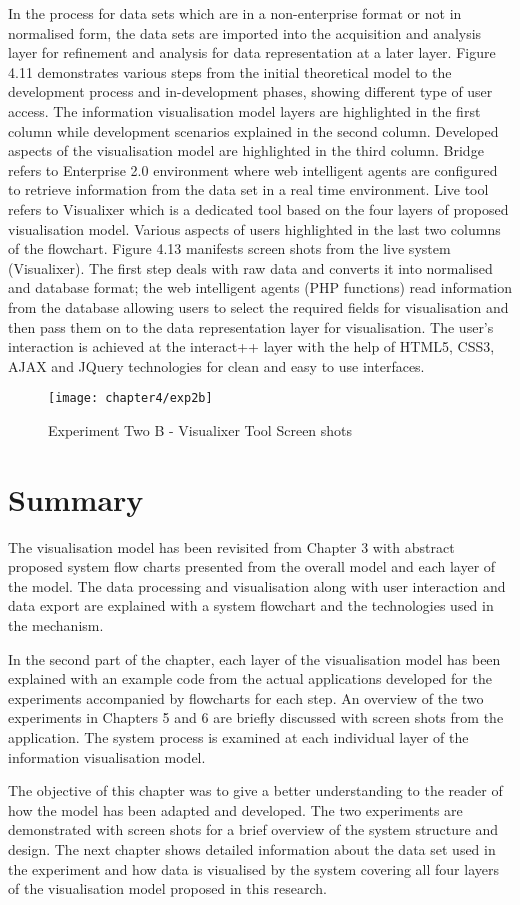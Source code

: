 In the process for data sets which are in a non-enterprise format or not in normalised form, the data sets are imported into the acquisition and analysis layer for refinement and analysis for data representation at a later layer. Figure 4.11 demonstrates various steps from the initial theoretical model to the development process and in-development phases, showing different type of user access. The information visualisation model layers are highlighted in the first column while development scenarios explained in the second column. Developed aspects of the visualisation model are highlighted in the third column. Bridge refers to Enterprise 2.0 environment where web intelligent agents are configured to retrieve information from the data set in a real time environment. Live tool refers to Visualixer which is a dedicated tool based on the four layers of proposed visualisation model. Various aspects of users highlighted in the last two columns of the flowchart. Figure 4.13 manifests screen shots from the live system (Visualixer). The first step deals with raw data and converts it into normalised and database format; the web intelligent agents (PHP functions) read information from the database allowing users to select the required fields for visualisation and then pass them on to the data representation layer for visualisation. The user's interaction is achieved at the interact++ layer with the help of HTML5, CSS3, AJAX and JQuery technologies for clean and easy to use interfaces.

\begin{figure}[H]
\centering
\texttt{[image: chapter4/exp2b]}
\caption{Experiment Two B  - Visualixer Tool Screen shots}
\end{figure}

\section{Summary}

The visualisation model has been revisited from Chapter 3 with abstract proposed system flow charts presented from the overall model and each layer of the model. The data processing and visualisation along with user interaction and data export are explained with a system flowchart and the technologies used in the mechanism.

In the second part of the chapter, each layer of the visualisation model has been explained with an example code from the actual applications developed for the experiments accompanied by flowcharts for each step. An overview of the two experiments in Chapters 5 and 6 are briefly discussed with screen shots from the application. The system process is examined at each individual layer of the information visualisation model. 

The objective of this chapter was to give a better understanding to the reader of how the model has been adapted and developed. The two experiments are demonstrated with screen shots for a brief overview of the system structure and design. The next chapter shows detailed information about the data set used in the experiment and how data is visualised by the system covering all four layers of the visualisation model proposed in this research.
